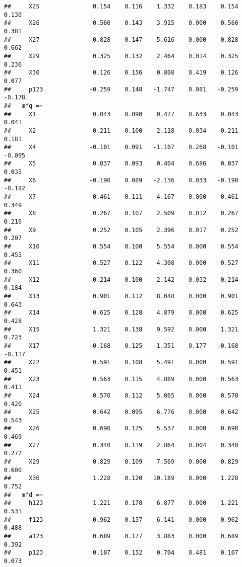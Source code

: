 \documentclass[english,man]{apa6}
\theoremstyle{definition}
\theoremstyle{definition}
\theoremstyle{definition}
\theoremstyle{remark}
\begin{document}
\begin{verbatim}
##     X25               0.154    0.116    1.332    0.183    0.154    0.130
##     X26               0.560    0.143    3.915    0.000    0.560    0.381
##     X27               0.828    0.147    5.616    0.000    0.828    0.662
##     X29               0.325    0.132    2.464    0.014    0.325    0.236
##     X30               0.126    0.156    0.808    0.419    0.126    0.077
##     p123             -0.259    0.148   -1.747    0.081   -0.259   -0.178
##   mfq =~                                                                
##     X1                0.043    0.090    0.477    0.633    0.043    0.041
##     X2                0.211    0.100    2.118    0.034    0.211    0.181
##     X4               -0.101    0.091   -1.107    0.268   -0.101   -0.095
##     X5                0.037    0.093    0.404    0.686    0.037    0.035
##     X6               -0.190    0.089   -2.136    0.033   -0.190   -0.182
##     X7                0.461    0.111    4.167    0.000    0.461    0.349
##     X8                0.267    0.107    2.509    0.012    0.267    0.216
##     X9                0.252    0.105    2.396    0.017    0.252    0.207
##     X10               0.554    0.100    5.554    0.000    0.554    0.455
##     X11               0.527    0.122    4.308    0.000    0.527    0.360
##     X12               0.214    0.100    2.142    0.032    0.214    0.184
##     X13               0.901    0.112    8.048    0.000    0.901    0.643
##     X14               0.625    0.128    4.879    0.000    0.625    0.428
##     X15               1.321    0.138    9.592    0.000    1.321    0.723
##     X17              -0.168    0.125   -1.351    0.177   -0.168   -0.117
##     X22               0.591    0.108    5.491    0.000    0.591    0.451
##     X23               0.563    0.115    4.889    0.000    0.563    0.411
##     X24               0.570    0.112    5.065    0.000    0.570    0.420
##     X25               0.642    0.095    6.776    0.000    0.642    0.543
##     X26               0.690    0.125    5.537    0.000    0.690    0.469
##     X27               0.340    0.119    2.864    0.004    0.340    0.272
##     X29               0.829    0.109    7.569    0.000    0.829    0.600
##     X30               1.228    0.120   10.189    0.000    1.228    0.752
##   mfd =~                                                                
##     h123              1.221    0.178    6.877    0.000    1.221    0.531
##     f123              0.962    0.157    6.141    0.000    0.962    0.488
##     a123              0.689    0.177    3.883    0.000    0.689    0.392
##     p123              0.107    0.152    0.704    0.481    0.107    0.073

\end{verbatim}
\end{document}
